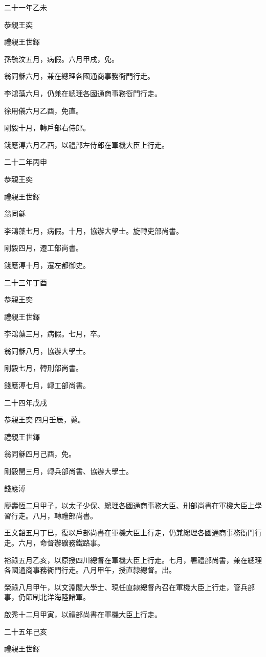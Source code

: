 \begin{pinyinscope}
二十一年乙未

恭親王奕

禮親王世鐸

孫毓汶五月，病假。六月甲戌，免。

翁同龢六月，兼在總理各國通商事務衙門行走。

李鴻藻六月，仍兼在總理各國通商事務衙門行走。

徐用儀六月乙酉，免直。

剛毅十月，轉戶部右侍郎。

錢應溥六月乙酉，以禮部左侍郎在軍機大臣上行走。

二十二年丙申

恭親王奕

禮親王世鐸

翁同龢

李鴻藻七月，病假。十月，協辦大學士。旋轉吏部尚書。

剛毅四月，遷工部尚書。

錢應溥十月，遷左都御史。

二十三年丁酉

恭親王奕

禮親王世鐸

李鴻藻三月，病假。七月，卒。

翁同龢八月，協辦大學士。

剛毅七月，轉刑部尚書。

錢應溥七月，轉工部尚書。

二十四年戊戌

恭親王奕四月壬辰，薨。

禮親王世鐸

翁同龢四月己酉，免。

剛毅閏三月，轉兵部尚書、協辦大學士。

錢應溥

廖壽恆二月甲子，以太子少保、總理各國通商事務大臣、刑部尚書在軍機大臣上學習行走。八月，轉禮部尚書。

王文韶五月丁巳，復以戶部尚書在軍機大臣上行走，仍兼總理各國通商事務衙門行走。六月，命督辦礦務鐵路事。

裕祿五月乙亥，以原授四川總督在軍機大臣上行走。七月，署禮部尚書，兼在總理各國通商事務衙門行走。八月甲午，授直隸總督。出。

榮祿八月甲午，以文淵閣大學士、現任直隸總督內召在軍機大臣上行走，管兵部事，仍節制北洋海陸諸軍。

啟秀十二月甲寅，以禮部尚書在軍機大臣上行走。

二十五年己亥

禮親王世鐸


\end{pinyinscope}
